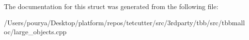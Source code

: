 The documentation for this struct was generated from the following file\+:\begin{DoxyCompactItemize}
\item 
/\+Users/pourya/\+Desktop/platform/repos/tetcutter/src/3rdparty/tbb/src/tbbmalloc/large\+\_\+objects.\+cpp\end{DoxyCompactItemize}
